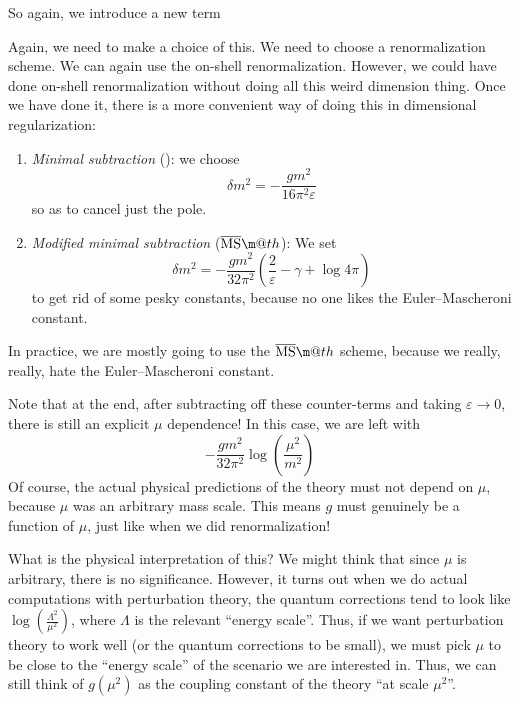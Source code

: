 \documentclass[a4paper]{article}
\makeatletter
\newcommand*{\textoverline}[1]{$\overline{\hbox{#1}}\m@th$}
\makeatother
\begin{document}
So again, we introduce a new term
\begin{center}
\end{center}
Again, we need to make a choice of this. We need to choose a renormalization scheme. We can again use the on-shell renormalization. However, we could have done on-shell renormalization without doing all this weird dimension thing. Once we have done it, there is a more convenient way of doing this in dimensional regularization:
\begin{enumerate}
  \item \emph{Minimal subtraction} (): we choose
    \[
      \delta m^2 = - \frac{gm^2}{16\pi^2\varepsilon}
    \]
    so as to cancel just the pole.
  \item \emph{Modified minimal subtraction} (\emph{\textoverline{MS}}): We set
    \[
      \delta m^2 = - \frac{gm^2}{32\pi^2} \left(\frac{2}{\varepsilon} - \gamma + \log 4\pi\right)
    \]
    to get rid of some pesky constants, because no one likes the Euler--Mascheroni constant.
\end{enumerate}
In practice, we are mostly going to use the \textoverline{MS} scheme, because we really, really, hate the Euler--Mascheroni constant.

Note that at the end, after subtracting off these counter-terms and taking $\varepsilon \to 0$, there is still an explicit $\mu$ dependence! In this case, we are left with
\[
  -\frac{gm^2}{32\pi^2} \log \left(\frac{\mu^2}{m^2}\right)
\]
Of course, the actual physical predictions of the theory must not depend on $\mu$, because $\mu$ was an arbitrary mass scale. This means $g$ must genuinely be a function of $\mu$, just like when we did renormalization!

What is the physical interpretation of this? We might think that since $\mu$ is arbitrary, there is no significance. However, it turns out when we do actual computations with perturbation theory, the quantum corrections tend to look like $\log \left(\frac{\Lambda^2}{\mu^2}\right)$, where $\Lambda$ is the relevant ``energy scale''. Thus, if we want perturbation theory to work well (or the quantum corrections to be small), we must pick $\mu$ to be close to the ``energy scale'' of the scenario we are interested in. Thus, we can still think of $g(\mu^2)$ as the coupling constant of the theory ``at scale $\mu^2$''.
\end{document}
